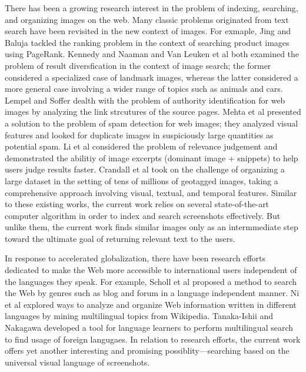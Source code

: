 \documentclass{www2010-submission}
\begin{document}
There has been a growing research interest in the problem of indexing,
searching, and organizing images on the web.  Many classic problems
originated from text search have been revisited in the new context of
images. For exmaple, Jing and Baluja \cite{Jing} tackled the ranking
problem in the context of searching product images using PageRank.
Kennedy and Naaman \cite{Kennedy} and Van Leuken et al
\cite{vanLeuken} both examined the problem of result diversfication in
the context of image search; the former considered a specialized case
of landmark images, whereas the latter considered a more general case
involving a wider range of topics such as animals and cars. Lempel and
Soffer \cite{Lempel} dealth with the problem of authority
identification for web images by analyzing the link strcutures of the
source pages.  Mehta et al \cite{Mehta} presented a solution to the
problem of spam detection for web images; they analyzed visual
features and looked for duplicate images in suspiciously large
quantities as potential spam.  Li et al \cite{Li} considered the
problem of relevance judgement and demonstrated the abilitiy of image
excerpts (dominant image + snippets) to help users judge results
faster. Crandall et al \cite{Crandall} took on the challenge of
organizing a large dataset in the setting of tens of millions of
geotagged images, taking a comprehensive approach involving visual,
textual, and temporal features. Similar to these existing works, the
current work relies on several state-of-the-art computer algorithm in
order to index and search screenshots effectively. But unlike them,
the current work finds similar images only as an intermmediate step
toward the ultimate goal of returning relevant text to the users.

In response to accelerated globalization, there have been research
efforts dedicated to make the Web more accessible to international
users independent of the languages they speak. For example, Scholl et
al \cite{Scholl} proposed a method to search the Web by genres such as
blog and forum in a language independent manner. Ni et al \cite{Ni}
explored ways to analyze and organize Web information written in
different languages by mining multilingual topics from
Wikipedia. Tanaka-Ishii and Nakagawa \cite{Tanaka-Ishii} developed a
tool for language learners to perform multilingual search to find
usage of foreign langugaes. In relation to research efforts,
the current work offers yet another interesting and promising
possiblity---searching based on the universal
visual language of screenshots.
\end{document}
